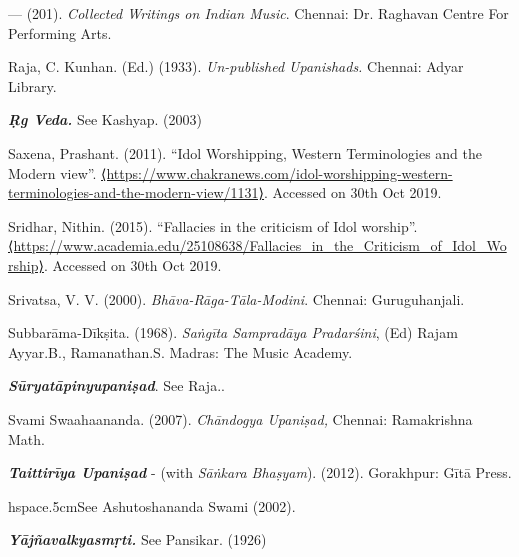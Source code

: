 \begin{thebibliography}{99}
  — (201). \textit{Collected Writings on Indian Music}. Chennai: Dr. Raghavan Centre For Performing Arts.

  Raja, C. Kunhan. (Ed.) (1933). \textit{Un-published Upanishads.} Chennai: Adyar Library.

  \textbf{\textit{Ṛg Veda.}} See Kashyap. (2003)

  Saxena, Prashant. (2011). “Idol Worshipping, Western Terminologies and the Modern view”. \url{⟨https://www.chakranews.com/idol-worshipping-western-terminologies-and-the-modern-view/1131⟩}. Accessed on 30th Oct 2019.

  Sridhar, Nithin. (2015). “Fallacies in the criticism of Idol worship”. \url{⟨https://www.academia.edu/25108638/Fallacies_in_the_Criticism_of_Idol_Worship⟩}. Accessed on 30th Oct 2019.

  Srivatsa, V. V. (2000). \textit{Bhāva-Rāga-Tāla-Modini}. Chennai: Guruguhanjali.

  Subbarāma-Dīkṣita. (1968). \textit{Saṅgīta Sampradāya Pradarśini}, (Ed) Rajam Ayyar.B., Ramanathan.S. Madras: The Music Academy.

  \textbf{\textit{Sūryatāpinyupaniṣad}}. See Raja..

  Svami Swaahaananda. (2007).\textit{ Chāndogya Upaniṣad,} Chennai: Rama\-krishna Math.

  \textbf{\textit{Taittirīya Upaniṣad}} - (with \textit{Sāṅkara Bhaṣyam}). (2012). Gorakhpur: Gītā Press.

  hspace{.5cm}See Ashutoshananda Swami (2002).

  \textbf{\textit{Yājñavalkyasmṛti.}} See Pansikar. (1926)

 \end{thebibliography}

\theendnotes

